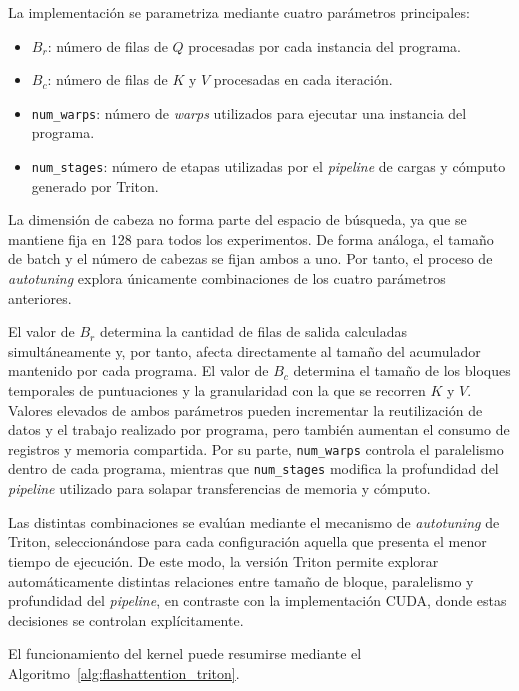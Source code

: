 La implementación se parametriza mediante cuatro parámetros principales:

\begin{itemize}
\item \(B_r\): número de filas de \(Q\) procesadas por cada instancia del programa.
\item \(B_c\): número de filas de \(K\) y \(V\) procesadas en cada iteración.
\item \texttt{num_warps}: número de \textit{warps} utilizados para ejecutar una instancia del programa.
\item \texttt{num_stages}: número de etapas utilizadas por el \textit{pipeline} de cargas y cómputo generado por Triton.
\end{itemize}

La dimensión de cabeza no forma parte del espacio de búsqueda, ya que se mantiene fija en 128 para todos los experimentos. De forma análoga, el tamaño de batch y el número de cabezas se fijan ambos a uno. Por tanto, el proceso de \textit{autotuning} explora únicamente combinaciones de los cuatro parámetros anteriores.

El valor de \(B_r\) determina la cantidad de filas de salida calculadas simultáneamente y, por tanto, afecta directamente al tamaño del acumulador mantenido por cada programa. El valor de \(B_c\) determina el tamaño de los bloques temporales de puntuaciones y la granularidad con la que se recorren \(K\) y \(V\). Valores elevados de ambos parámetros pueden incrementar la reutilización de datos y el trabajo realizado por programa, pero también aumentan el consumo de registros y memoria compartida. Por su parte, \texttt{num_warps} controla el paralelismo dentro de cada programa, mientras que \texttt{num_stages} modifica la profundidad del \textit{pipeline} utilizado para solapar transferencias de memoria y cómputo.

Las distintas combinaciones se evalúan mediante el mecanismo de \textit{autotuning} de Triton, seleccionándose para cada configuración aquella que presenta el menor tiempo de ejecución. De este modo, la versión Triton permite explorar automáticamente distintas relaciones entre tamaño de bloque, paralelismo y profundidad del \textit{pipeline}, en contraste con la implementación CUDA, donde estas decisiones se controlan explícitamente.

El funcionamiento del kernel puede resumirse mediante el Algoritmo~\ref{alg:flashattention_triton}.

